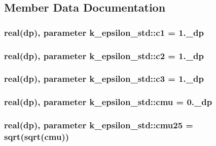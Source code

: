 \subsection{Member Data Documentation}
\hypertarget{classk__epsilon__std_a93ff6c4e5f083bc36a60209c171035f8}{
\subsubsection[{c1}]{\setlength{\rightskip}{0pt plus 5cm}real(dp), parameter k\-\_\-epsilon\-\_\-std\-::c1 = 1.\-\_\-dp}}\label{classk__epsilon__std_a93ff6c4e5f083bc36a60209c171035f8}
\hypertarget{classk__epsilon__std_a42ad7b9456f3e4d745d15cbfa7dd05c9}{
\subsubsection[{c2}]{\setlength{\rightskip}{0pt plus 5cm}real(dp), parameter k\-\_\-epsilon\-\_\-std\-::c2 = 1.\-\_\-dp}}\label{classk__epsilon__std_a42ad7b9456f3e4d745d15cbfa7dd05c9}
\hypertarget{classk__epsilon__std_a95e68b7b052df6838c3c516dd66cf0c5}{
\subsubsection[{c3}]{\setlength{\rightskip}{0pt plus 5cm}real(dp), parameter k\-\_\-epsilon\-\_\-std\-::c3 = 1.\-\_\-dp}}\label{classk__epsilon__std_a95e68b7b052df6838c3c516dd66cf0c5}
\hypertarget{classk__epsilon__std_ab8b45782adecbcc30ebf7b73d34a5ebd}{
\subsubsection[{cmu}]{\setlength{\rightskip}{0pt plus 5cm}real(dp), parameter k\-\_\-epsilon\-\_\-std\-::cmu = 0.\-\_\-dp}}\label{classk__epsilon__std_ab8b45782adecbcc30ebf7b73d34a5ebd}
\hypertarget{classk__epsilon__std_a5560ee6203c001281958b7335769e6e4}{
\subsubsection[{cmu25}]{\setlength{\rightskip}{0pt plus 5cm}real(dp), parameter k\-\_\-epsilon\-\_\-std\-::cmu25 = sqrt(sqrt({\bf cmu}))}}\label{classk__epsilon__std_a5560ee6203c001281958b7335769e6e4}
